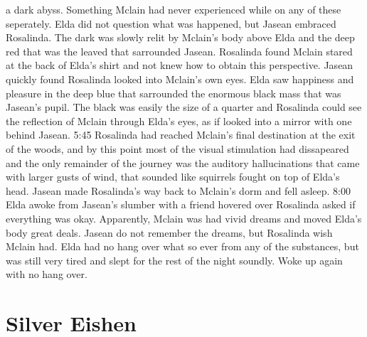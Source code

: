 \documentclass[12pt]{book}
\begin{document}
a dark abyss. Something Mclain had never experienced while on any of these seperately. Elda did not question what was happened, but Jasean embraced Rosalinda. The dark was slowly relit by Mclain's body above Elda and the deep red that was the leaved that sarrounded Jasean. Rosalinda found Mclain stared at the back of Elda's shirt and not knew how to obtain this perspective. Jasean quickly found Rosalinda looked into Mclain's own eyes. Elda saw happiness and pleasure in the deep blue that sarrounded the enormous black mass that was Jasean's pupil. The black was easily the size of a quarter and Rosalinda could see the reflection of Mclain through Elda's eyes, as if looked into a mirror with one behind Jasean. 5:45 Rosalinda had reached Mclain's final destination at the exit of the woods, and by this point most of the visual stimulation had dissapeared and the only remainder of the journey was the auditory hallucinations that came with larger gusts of wind, that sounded like squirrels fought on top of Elda's head. Jasean made Rosalinda's way back to Mclain's dorm and fell asleep. 8:00 Elda awoke from Jasean's slumber with a friend hovered over Rosalinda asked if everything was okay. Apparently, Mclain was had vivid dreams and moved Elda's body great deals. Jasean do not remember the dreams, but Rosalinda wish Mclain had. Elda had no hang over what so ever from any of the substances, but was still very tired and slept for the rest of the night soundly. Woke up again with no hang over.






\chapter{Silver Eishen}
\end{document}
